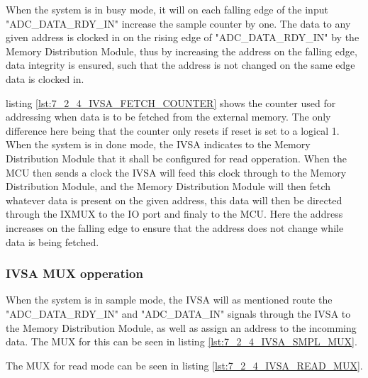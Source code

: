 When the system is in busy mode, it will on each falling edge of the input "ADC\_DATA\_RDY\_IN" increase the sample counter by one. The data to any given address is clocked in on the rising edge of "ADC\_DATA\_RDY\_IN" by the Memory Distribution Module, thus by increasing the address on the falling edge, data integrity is ensured, such that the address is not changed on the same edge data is clocked in.



listing \ref{lst:7_2_4_IVSA_FETCH_COUNTER} shows the counter used for addressing when data is to be fetched from the external memory. The only difference here being that the counter only resets if reset is set to a logical 1. When the system is in done mode, the IVSA indicates to the Memory Distribution Module that it shall be configured for read opperation. When the MCU then sends a clock the IVSA will feed this clock through to the Memory Distribution Module, and the Memory Distribution Module will then fetch whatever data is present on the given address, this data will then be directed through the IXMUX to the IO port and finaly to the MCU. Here the address increases on the falling edge to ensure that the address does not change while data is being fetched. 



\subsubsection{IVSA MUX opperation}
When the system is in sample mode, the IVSA will as mentioned route the "ADC\_DATA\_RDY\_IN" and "ADC\_DATA\_IN" signals through the IVSA to the Memory Distribution Module, as well as assign an address to the incomming data. The MUX for this can be seen in listing \ref{lst:7_2_4_IVSA_SMPL_MUX}. 



The MUX for read mode can be seen in listing \ref{lst:7_2_4_IVSA_READ_MUX}.


